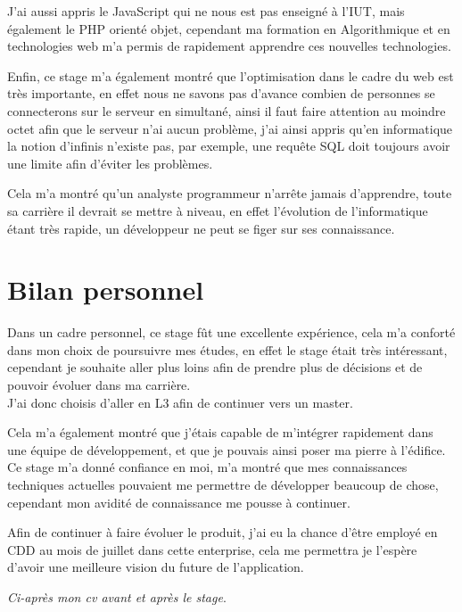 J'ai aussi appris le JavaScript qui ne nous est pas enseigné à l'IUT, mais également le PHP orienté objet, cependant ma formation en Algorithmique et en technologies web m'a permis de rapidement apprendre ces nouvelles technologies.

Enfin, ce stage m'a également montré que l'optimisation dans le cadre du web est très importante, en effet nous ne savons pas d'avance combien de personnes se connecterons sur le serveur en simultané, ainsi il faut faire attention au moindre octet afin que le serveur n'ai aucun problème, j'ai ainsi appris qu'en informatique la notion d'infinis n'existe pas, par exemple, une requête SQL doit toujours avoir une limite afin d'éviter les problèmes.

Cela m'a montré qu'un analyste programmeur n'arrête jamais d'apprendre, toute sa carrière il devrait se mettre à niveau, en effet l'évolution de l'informatique étant très rapide, un développeur ne peut se figer sur ses connaissance.

\section{Bilan personnel}
    Dans un cadre personnel, ce stage fût une excellente expérience, cela m'a conforté dans mon choix de poursuivre mes études, en effet le stage était très intéressant, cependant je souhaite aller plus loins afin de prendre plus de décisions et de pouvoir évoluer dans ma carrière.\\
    J'ai donc choisis d'aller en L3 afin de continuer vers un master.

    Cela m'a également montré que j'étais capable de m'intégrer rapidement dans une équipe de développement, et que je pouvais ainsi poser ma pierre à l'édifice. Ce stage m'a donné confiance en moi, m'a montré que mes connaissances techniques actuelles pouvaient me permettre de développer beaucoup de chose, cependant mon avidité de connaissance me pousse à continuer.

    Afin de continuer à faire évoluer le produit, j'ai eu la chance d'être employé en CDD au mois de juillet dans cette enterprise, cela me permettra je l'espère d'avoir une meilleure vision du future de l'application.
    
\vfill
\textit{Ci-après mon cv avant et après le stage}.


